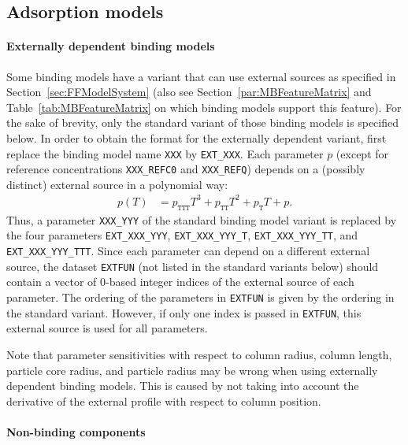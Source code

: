 \subsection{Adsorption models}\label{sec:FFAdsorption}

\paragraph{Externally dependent binding models}

Some binding models have a variant that can use external sources as specified in Section~\ref{sec:FFModelSystem} (also see Section~\ref{par:MBFeatureMatrix} and Table~\ref{tab:MBFeatureMatrix} on which binding models support this feature).
For the sake of brevity, only the standard variant of those binding models is specified below.
In order to obtain the format for the externally dependent variant, first replace the binding model name \texttt{XXX} by \texttt{EXT\_XXX}.
Each parameter $p$ (except for reference concentrations \texttt{XXX\_REFC0} and \texttt{XXX\_REFQ}) depends on a (possibly distinct) external source in a polynomial way:
\begin{align*}
  p(T) &= p_{\texttt{TTT}} T^3 + p_{\texttt{TT}} T^2 + p_{\texttt{T}} T + p.
\end{align*}
Thus, a parameter \texttt{XXX\_YYY} of the standard binding model variant is replaced by the four parameters \texttt{EXT\_XXX\_YYY}, \texttt{EXT\_XXX\_YYY\_T}, \texttt{EXT\_XXX\_YYY\_TT}, and \texttt{EXT\_XXX\_YYY\_TTT}.
Since each parameter can depend on a different external source, the dataset \texttt{EXTFUN} (not listed in the standard variants below) should contain a vector of 0-based integer indices of the external source of each parameter.
The ordering of the parameters in \texttt{EXTFUN} is given by the ordering in the standard variant.
However, if only one index is passed in \texttt{EXTFUN}, this external source is used for all parameters.

Note that parameter sensitivities with respect to column radius, column length, particle core radius, and particle radius may be wrong when using externally dependent binding models.
This is caused by not taking into account the derivative of the external profile with respect to column position.

\paragraph{Non-binding components}

